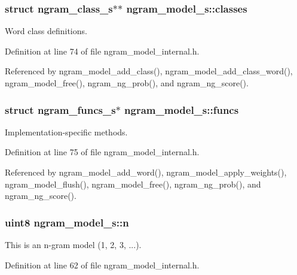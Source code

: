 \subsubsection[{classes}]{\setlength{\rightskip}{0pt plus 5cm}struct {\bf ngram\+\_\+class\+\_\+s}$\ast$$\ast$ ngram\+\_\+model\+\_\+s\+::classes}\label{structngram__model__s_a39384af3e6b53591d433436db011ac8d}


Word class definitions. 



Definition at line 74 of file ngram\+\_\+model\+\_\+internal.\+h.



Referenced by ngram\+\_\+model\+\_\+add\+\_\+class(), ngram\+\_\+model\+\_\+add\+\_\+class\+\_\+word(), ngram\+\_\+model\+\_\+free(), ngram\+\_\+ng\+\_\+prob(), and ngram\+\_\+ng\+\_\+score().

\subsubsection[{funcs}]{\setlength{\rightskip}{0pt plus 5cm}struct {\bf ngram\+\_\+funcs\+\_\+s}$\ast$ ngram\+\_\+model\+\_\+s\+::funcs}\label{structngram__model__s_ad3d9d8ad9773f958a89534220eda6fb9}


Implementation-\/specific methods. 



Definition at line 75 of file ngram\+\_\+model\+\_\+internal.\+h.



Referenced by ngram\+\_\+model\+\_\+add\+\_\+word(), ngram\+\_\+model\+\_\+apply\+\_\+weights(), ngram\+\_\+model\+\_\+flush(), ngram\+\_\+model\+\_\+free(), ngram\+\_\+ng\+\_\+prob(), and ngram\+\_\+ng\+\_\+score().

\subsubsection[{n}]{\setlength{\rightskip}{0pt plus 5cm}uint8 ngram\+\_\+model\+\_\+s\+::n}\label{structngram__model__s_a3c87bc1b678662a2c8930b3b8c33a80f}


This is an n-\/gram model (1, 2, 3, ...). 



Definition at line 62 of file ngram\+\_\+model\+\_\+internal.\+h.



